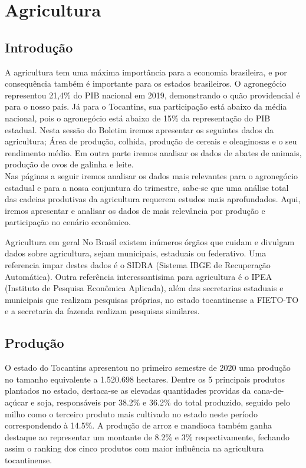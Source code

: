 \chapter{Agricultura}
\section{Introdução}
\par A agricultura tem uma máxima importância para a economia brasileira, e por consequência também é importante para os estados brasileiros. O agronegócio representou 21,4\% do PIB nacional em 2019, demonstrando o quão providencial é para o nosso país. Já para o Tocantins, sua participação está abaixo da média nacional, pois o agronegócio está abaixo de 15\% da representação do PIB estadual. Nesta sessão do Boletim iremos apresentar os seguintes dados da agricultura; Área de produção, colhida, produção de cereais e oleaginosas e o seu rendimento médio. Em outra parte iremos analisar os dados de abates de animais, produção de ovos de galinha e leite. 
\\
Nas páginas a seguir iremos analisar os dados mais relevantes para o agronegócio estadual e para a nossa conjuntura do trimestre, sabe-se que uma análise total das cadeias produtivas da agricultura requerem estudos mais aprofundados. Aqui, iremos apresentar e analisar os dados de mais relevância por produção e participação no cenário econômico.

\begin{smbox}[label={labelbox},nameref={Agricultura}]{Agricultura em geral}
No Brasil existem inúmeros órgãos que cuidam e divulgam dados sobre agricultura, sejam municipais, estaduais ou federativo. Uma referencia impar destes dados é o SIDRA (Sistema IBGE de Recuperação Automática). Outra referência interessantisima para agricultura é o IPEA (Instituto de Pesquisa Econômica Aplicada), além das secretarias estaduais e municipais que realizam pesquisas próprias, no estado tocantinense a FIETO-TO e a secretaria da fazenda realizam pesquisas similares.
\end{smbox}

\section{Produção}
\par O estado do Tocantins apresentou no primeiro semestre de 2020 uma produção no tamanho equivalente a 1.520.698 hectares. Dentre os 5 principais produtos plantados no estado, destaca-se as elevadas quantidades providas da cana-de-açúcar e soja, responsáveis por 38.2\% e 36.2\% do total produzido, seguido pelo milho como o terceiro produto mais cultivado no estado neste período correspondendo à 14.5\%. A produção de arroz e mandioca também ganha destaque ao representar um montante de 8.2\% e 3\% respectivamente, fechando assim o ranking dos cinco produtos com maior influência na agricultura tocantinense. 

